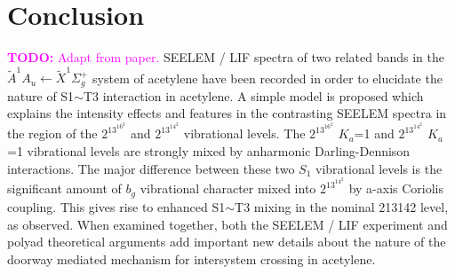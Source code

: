 \documentclass[12pt,draft]{mitthesis}
\newcommand{\TODO} [1]{\textcolor{magenta}{\textbf{TODO:} #1}}
\newcommand{\POINT}[1]{\textcolor{magenta}{#1}}
\begin{document}









\section{Conclusion}

\TODO{Adapt from paper.}  SEELEM / LIF spectra of two related bands in
the $\tilde{A}^1A_u \leftarrow \tilde{X} ^1\Sigma_g^+$ system of
acetylene have been recorded in order to elucidate the nature of
S1$\sim$T3 interaction in acetylene. A simple model is proposed which
explains the intensity effects and features in the contrasting SEELEM
spectra in the region of the $2^13^16^2$ and $2^13^14^2$ vibrational
levels. The $2^13^16^2$ $K_a$=1 and $2^13^14^2$ $K_a$=1 vibrational
levels are strongly mixed by anharmonic Darling-Dennison
interactions. The major difference between these two $S_1$ vibrational
levels is the significant amount of $b_g$ vibrational character mixed
into $2^13^14^2$ by a-axis Coriolis coupling. This gives rise to
enhanced S1$\sim$T3 mixing in the nominal 213142 level, as observed.
When examined together, both the SEELEM / LIF experiment and polyad
theoretical arguments add important new details about the nature of
the doorway mediated mechanism for intersystem crossing in acetylene.
\end{document}
